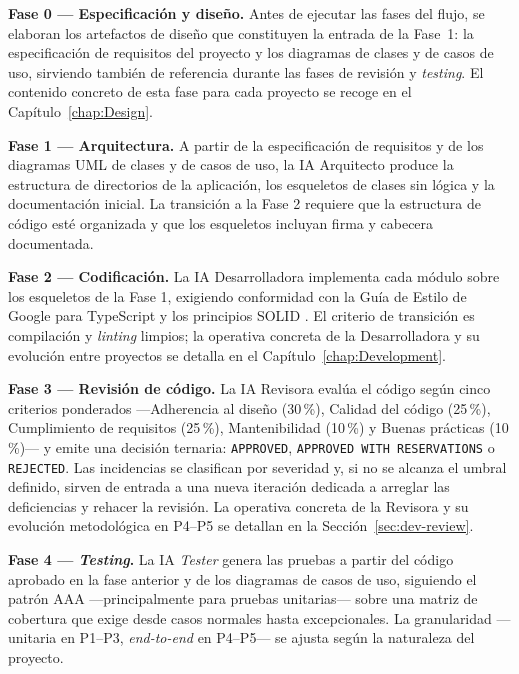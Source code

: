 \textbf{Fase 0 --- Especificación y diseño.} Antes de ejecutar las fases del flujo, se elaboran los artefactos de diseño que constituyen la entrada de la Fase~1: la especificación de requisitos del proyecto y los diagramas de clases y de casos de uso, sirviendo también de referencia durante las fases de revisión y \textit{testing}. El contenido concreto de esta fase para cada proyecto se recoge en el Capítulo~\ref{chap:Design}.

\textbf{Fase 1 --- Arquitectura.} A partir de la especificación de requisitos y de los diagramas UML \cite{Fowler:2004:UML} de clases y de casos de uso, la \ac{IA} Arquitecto produce la estructura de directorios de la aplicación, los esqueletos de clases sin lógica y la documentación inicial. La transición a la Fase 2 requiere que la estructura de código esté organizada y que los esqueletos incluyan firma y cabecera documentada.

\textbf{Fase 2 --- Codificación.} La \ac{IA} Desarrolladora implementa cada módulo sobre los esqueletos de la Fase 1, exigiendo conformidad con la Guía de Estilo de Google para TypeScript y los principios \ac{SOLID} \cite{Martin:2003:Agile}. 
El criterio de transición es compilación y \textit{linting} limpios; la operativa concreta de la Desarrolladora y su evolución entre proyectos se detalla en el Capítulo~\ref{chap:Development}.

\textbf{Fase 3 --- Revisión de código.} La \ac{IA} Revisora evalúa el código según cinco criterios ponderados ---Adherencia al diseño (30\,\%), Calidad del código (25\,\%), Cumplimiento de requisitos (25\,\%), Mantenibilidad (10\,\%) y Buenas prácticas (10\,\%)--- y emite una decisión ternaria: \texttt{APPROVED}, \texttt{APPROVED WITH RESERVATIONS} o \texttt{REJECTED}. 
Las incidencias se clasifican por severidad y, si no se alcanza el umbral definido, sirven de entrada a una nueva iteración dedicada a arreglar las deficiencias y rehacer la revisión. La operativa concreta de la Revisora y su evolución metodológica en P4--P5 se detallan en la Sección~\ref{sec:dev-review}.

\textbf{Fase 4 --- \textit{Testing}.} La \ac{IA} \textit{Tester} genera las pruebas a partir del código aprobado en la fase anterior y de los diagramas de casos de uso, siguiendo el patrón \ac{AAA} ---principalmente para pruebas unitarias--- sobre una matriz de cobertura que exige desde casos normales hasta excepcionales. La granularidad ---unitaria en P1--P3, \textit{end-to-end} en P4--P5--- se ajusta según la naturaleza del proyecto.

